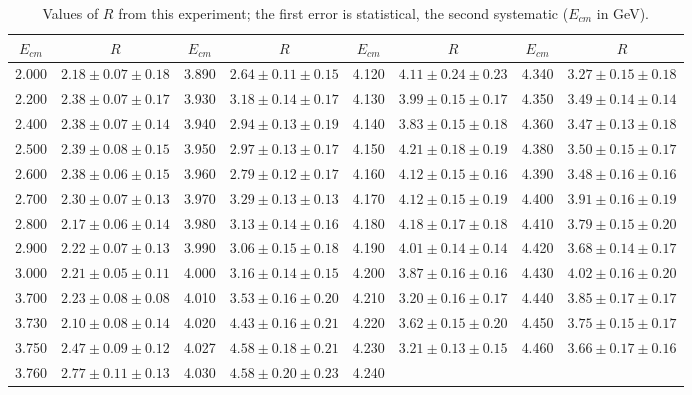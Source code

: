 \begin{table}[htbp]
\begin{center}
\caption{Values of $R$ from this experiment; the first error is 
statistical, the second systematic ($E_{cm}$ in GeV).} 
%
\begin{tabular}{cccccccc}
$E_{cm}$ & $R$   & $E_{cm}$ & $R$ &   $E_{cm}$ & $R$ &
$E_{cm}$ & $R$ \\ \hline
2.000& $2.18\pm0.07\pm0.18$ &3.890& $2.64\pm0.11\pm0.15$ &4.120
& $4.11\pm0.24\pm0.23$ &4.340& $3.27\pm0.15\pm0.18$ \\
2.200& $2.38\pm0.07\pm0.17$ &3.930& $3.18\pm0.14\pm0.17$ &4.130
& $3.99\pm0.15\pm0.17$ &4.350& $3.49\pm0.14\pm0.14$ \\
2.400& $2.38\pm0.07\pm0.14$ &3.940& $2.94\pm0.13\pm0.19$ &4.140
& $3.83\pm0.15\pm0.18$ &4.360& $3.47\pm0.13\pm0.18$ \\
2.500& $2.39\pm0.08\pm0.15$ &3.950& $2.97\pm0.13\pm0.17$ &4.150
& $4.21\pm0.18\pm0.19$ &4.380& $3.50\pm0.15\pm0.17$ \\
2.600& $2.38\pm0.06\pm0.15$ &3.960& $2.79\pm0.12\pm0.17$ &4.160
& $4.12\pm0.15\pm0.16$ &4.390& $3.48\pm0.16\pm0.16$ \\
2.700& $2.30\pm0.07\pm0.13$ &3.970& $3.29\pm0.13\pm0.13$ &4.170
& $4.12\pm0.15\pm0.19$ &4.400& $3.91\pm0.16\pm0.19$ \\
2.800& $2.17\pm0.06\pm0.14$ &3.980& $3.13\pm0.14\pm0.16$ &4.180
& $4.18\pm0.17\pm0.18$ &4.410& $3.79\pm0.15\pm0.20$ \\
2.900& $2.22\pm0.07\pm0.13$ &3.990& $3.06\pm0.15\pm0.18$ &4.190
& $4.01\pm0.14\pm0.14$ &4.420& $3.68\pm0.14\pm0.17$ \\
3.000& $2.21\pm0.05\pm0.11$ &4.000& $3.16\pm0.14\pm0.15$ &4.200
& $3.87\pm0.16\pm0.16$ &4.430& $4.02\pm0.16\pm0.20$ \\
3.700& $2.23\pm0.08\pm0.08$ &4.010& $3.53\pm0.16\pm0.20$ &4.210
& $3.20\pm0.16\pm0.17$ &4.440& $3.85\pm0.17\pm0.17$ \\
3.730& $2.10\pm0.08\pm0.14$ &4.020& $4.43\pm0.16\pm0.21$ &4.220
& $3.62\pm0.15\pm0.20$ &4.450& $3.75\pm0.15\pm0.17$ \\
3.750& $2.47\pm0.09\pm0.12$ &4.027& $4.58\pm0.18\pm0.21$ &4.230
& $3.21\pm0.13\pm0.15$ &4.460& $3.66\pm0.17\pm0.16$ \\
3.760& $2.77\pm0.11\pm0.13$ &4.030& $4.58\pm0.20\pm0.23$ &4.240

\end{tabular}
\end{center}
\end{table}
